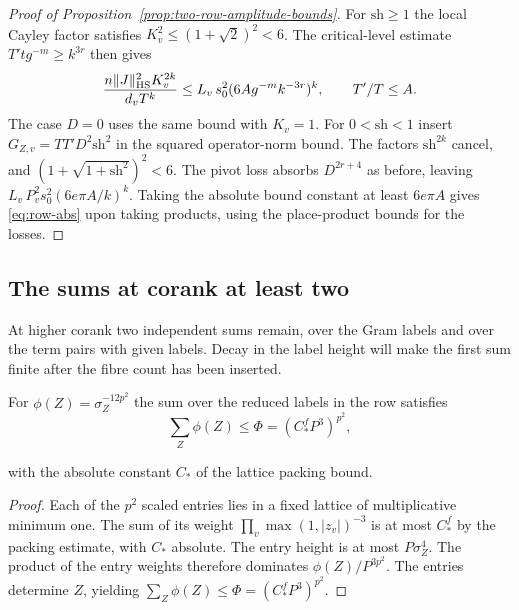 \begin{proof}[Proof of Proposition~\ref{prop:two-row-amplitude-bounds}]
For \(\mathrm{sh}\ge1\) the local Cayley factor satisfies
\(K_v^2\le(1+\sqrt2)^2<6\). The critical-level estimate
\(T'tg^{-m}\ge k^{3r}\) then gives
\[
 \frac{n\|J\|_{\rm HS}^2K_v^{2k}}{d_v T^k}
 \le L_v\,s_0^2(6A g^{-m}k^{-3r})^k,
 \qquad T'/T\le A .
\]
The case \(D=0\) uses the same bound with \(K_v=1\).
For \(0<\mathrm{sh}<1\) insert \(G_{Z,v}=TT'D^2\mathrm{sh}^2\)
in the squared operator-norm bound. The factors
\(\mathrm{sh}^{2k}\) cancel, and
\((1+\sqrt{1+\mathrm{sh}^2})^2<6\).
The pivot loss absorbs \(D^{2r+4}\) as before, leaving
\(L_v\,P_v^2s_0^2(6e\pi A/k)^k\).
Taking the absolute bound constant at least \(6e\pi A\)
gives \eqref{eq:row-abs} upon taking products, using the
place-product bounds for the losses.
\end{proof}

\subsection{The sums at corank at least two}

At higher corank two independent sums remain, over the Gram labels and over the term pairs with given labels. Decay in the label height will make the first sum finite after the fibre count has been inserted.

\begin{lemma}\label{lem:gram-label-sum}
For \(\phi(Z)=\sigma_Z^{-12p^2}\) the sum over the reduced labels in
the row satisfies 
\[
 \sum_Z\phi(Z)\le\Phi=(C_*^fP^3)^{p^2},
\]

with the absolute constant \(C_*\) of the lattice packing bound.
\end{lemma}

\begin{proof}
Each of the \(p^2\) scaled entries lies in a fixed lattice
of multiplicative minimum one. The sum of its weight
\(\prod_v\max(1,|z_v|)^{-3}\) is at most \(C_*^f\) by the
packing estimate, with \(C_*\) absolute. The entry height
is at most \(P\sigma_Z^4\). The product of the entry weights
therefore dominates \(\phi(Z)/P^{3p^2}\).
The entries determine \(Z\), yielding
\(\sum_Z\phi(Z)\le\Phi=(C_*^fP^3)^{p^2}\).
\end{proof}

